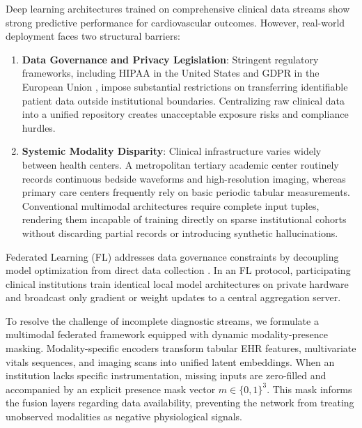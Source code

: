 \documentclass[10pt,conference]{IEEEtran}
\begin{document}
Deep learning architectures trained on comprehensive clinical data streams show strong predictive performance for cardiovascular outcomes. However, real-world deployment faces two structural barriers:
\begin{enumerate}
    \item \textbf{Data Governance and Privacy Legislation}: Stringent regulatory frameworks, including HIPAA in the United States \cite{annas2003hipaa} and GDPR in the European Union \cite{voigt2017eu}, impose substantial restrictions on transferring identifiable patient data outside institutional boundaries. Centralizing raw clinical data into a unified repository creates unacceptable exposure risks and compliance hurdles.
    \item \textbf{Systemic Modality Disparity}: Clinical infrastructure varies widely between health centers. A metropolitan tertiary academic center routinely records continuous bedside waveforms and high-resolution imaging, whereas primary care centers frequently rely on basic periodic tabular measurements. Conventional multimodal architectures require complete input tuples, rendering them incapable of training directly on sparse institutional cohorts without discarding partial records or introducing synthetic hallucinations.
\end{enumerate}

Federated Learning (FL) addresses data governance constraints by decoupling model optimization from direct data collection \cite{mcmahan2017communication, li2020federated_opt}. In an FL protocol, participating clinical institutions train identical local model architectures on private hardware and broadcast only gradient or weight updates to a central aggregation server.

To resolve the challenge of incomplete diagnostic streams, we formulate a multimodal federated framework equipped with dynamic modality-presence masking. Modality-specific encoders transform tabular EHR features, multivariate vitals sequences, and imaging scans into unified latent embeddings. When an institution lacks specific instrumentation, missing inputs are zero-filled and accompanied by an explicit presence mask vector $m \in \{0, 1\}^3$. This mask informs the fusion layers regarding data availability, preventing the network from treating unobserved modalities as negative physiological signals.
\end{document}
